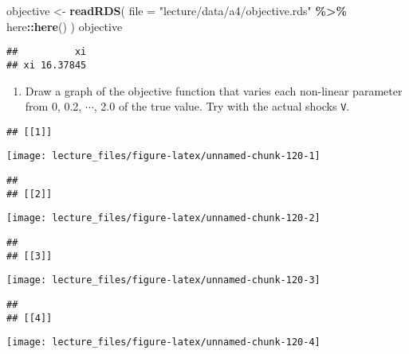 \documentclass[
]{book}
\newenvironment{Shaded}{\begin{snugshade}}{\end{snugshade}}
\newcommand{\AttributeTok}[1]{\textcolor[rgb]{0.13,0.29,0.53}{#1}}
\newcommand{\FunctionTok}[1]{\textcolor[rgb]{0.13,0.29,0.53}{\textbf{#1}}}
\newcommand{\NormalTok}[1]{#1}
\newcommand{\OtherTok}[1]{\textcolor[rgb]{0.56,0.35,0.01}{#1}}
\newcommand{\SpecialCharTok}[1]{\textcolor[rgb]{0.81,0.36,0.00}{\textbf{#1}}}
\newcommand{\StringTok}[1]{\textcolor[rgb]{0.31,0.60,0.02}{#1}}
\providecommand{\tightlist}{%
  \setlength{\itemsep}{0pt}\setlength{\parskip}{0pt}}
\begin{document}
\begin{Shaded}
\begin{Highlighting}[]
\NormalTok{objective }\OtherTok{\textless{}{-}} \FunctionTok{readRDS}\NormalTok{(}
  \AttributeTok{file =} \StringTok{"lecture/data/a4/objective.rds"} \SpecialCharTok{\%\textgreater{}\%}\NormalTok{ here}\SpecialCharTok{::}\FunctionTok{here}\NormalTok{()}
\NormalTok{)}
\NormalTok{objective}
\end{Highlighting}
\end{Shaded}

\begin{verbatim}
##          xi
## xi 16.37845
\end{verbatim}

\begin{enumerate}
\def\labelenumi{\arabic{enumi}.}
\setcounter{enumi}{11}
\tightlist
\item
  Draw a graph of the objective function that varies each non-linear parameter from 0, 0.2, \(\cdots\), 2.0 of the true value. Try with the actual shocks \texttt{V}.
\end{enumerate}

\begin{verbatim}
## [[1]]
\end{verbatim}

\begin{center}\texttt{[image: lecture\_files/figure-latex/unnamed-chunk-120-1]} \end{center}

\begin{verbatim}
## 
## [[2]]
\end{verbatim}

\begin{center}\texttt{[image: lecture\_files/figure-latex/unnamed-chunk-120-2]} \end{center}

\begin{verbatim}
## 
## [[3]]
\end{verbatim}

\begin{center}\texttt{[image: lecture\_files/figure-latex/unnamed-chunk-120-3]} \end{center}

\begin{verbatim}
## 
## [[4]]
\end{verbatim}

\begin{center}\texttt{[image: lecture\_files/figure-latex/unnamed-chunk-120-4]} \end{center}
\end{document}
